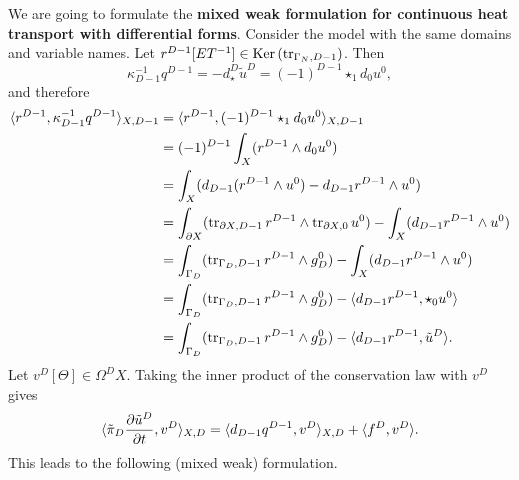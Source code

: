 \begin{discussion}
  We are going to formulate the \textbf{mixed weak formulation for continuous
  heat transport with differential forms}.
  Consider the model
  with the same domains and variable names.
  Let $r^{D - 1} [E T^{-1}] \in \mathop{\rm Ker}\nolimits \left(\mathop{\rm tr}\nolimits_{\Gamma_N, D - 1}\right)$.
  Then
  \begin{equation}
    \kappa_{D - 1}^{-1} q^{D - 1}
    = - d_\star^D \tilde{u}^D
    = (-1)^{D - 1} \star_1 d_0 u^0,
  \end{equation}
  and therefore
  \begin{equation}
    \begin{split}
      \langle r^{D - 1},\kappa_{D - 1}^{-1} q^{D - 1}\rangle_{X, D - 1}
      & = \langle r^{D - 1},(-1)^{D - 1} \star_1 d_0 u^0\rangle_{X, D - 1} \\
      & = (-1)^{D - 1} \int_X (r^{D - 1} \wedge d_0 u^0) \\
      & = \int_X
        (d_{D - 1}(r^{D - 1} \wedge u^0) - d_{D - 1} r^{D - 1} \wedge u^0) \\
      & = \int_{\partial X}
        (\mathop{\rm tr}\nolimits_{\partial X, D - 1} r^{D - 1} \wedge \mathop{\rm tr}\nolimits_{\partial X, 0} u^0)
        - \int_{X} (d_{D - 1} r^{D - 1} \wedge u^0) \\
      & = \int_{\Gamma_D} (\mathop{\rm tr}\nolimits_{\Gamma_D, D - 1} r^{D - 1} \wedge g_D^0)
        - \int_{X} (d_{D - 1} r^{D - 1} \wedge u^0) \\
      & = \int_{\Gamma_D} (\mathop{\rm tr}\nolimits_{\Gamma_D, D - 1} r^{D - 1} \wedge g_D^0)
        - \langle d_{D - 1} r^{D - 1},\star_0 u^0\rangle \\
      & = \int_{\Gamma_D} (\mathop{\rm tr}\nolimits_{\Gamma_D, D - 1} r^{D - 1} \wedge g_D^0)
        - \langle d_{D - 1} r^{D - 1},\tilde{u}^D\rangle.
    \end{split}
  \end{equation}
  Let $v^D [\Theta] \in \Omega^D X$.
  Taking the inner product of the conservation law with $v^D$ gives
  \begin{equation}
   \langle\tilde{\pi}_D \frac{\partial \tilde{u}^D}{\partial t},v^D\rangle_{X, D}
    = \langle d_{D - 1} q^{D - 1},v^D\rangle_{X, D} + \langle f^D,v^D\rangle.
  \end{equation}
  This leads to the following (mixed weak) formulation.
\end{discussion}
